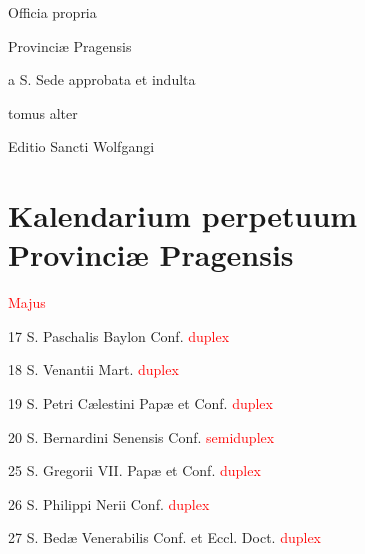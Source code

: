 \documentclass[a4paper, twoside, 10pt]{article}
\newcommand{\rubricatum}[1]{\textcolor{red}{#1}}
\newenvironment{kalendarium}{\setlength{\parindent}{0cm}}{}
\newcommand{\kMensis}[1]{
  \vspace{2mm}
  \hfill {\large\rubricatum{#1}} \hfill
  \vspace{1mm}}
\newcommand{\kDies}[3]{#1 \hspace{2mm} #2 \rubricatum{#3}

}
\begin{document}
\pagestyle{empty}

\begin{center}
{\Huge 
  Officia propria

  Provinciæ Pragensis}

{\Large 
  a S. Sede approbata et indulta}

\vfill

tomus alter

\vfill

Editio Sancti Wolfgangi
\end{center}

\cleardoublepage

\section*{Kalendarium perpetuum\\Provinciæ Pragensis}

\begin{kalendarium}

\kMensis{Majus}

\kDies{17}{S. Paschalis Baylon Conf.}{duplex}
\kDies{18}{S. Venantii Mart.}{duplex}
\kDies{19}{S. Petri Cælestini Papæ et Conf.}{duplex}
\kDies{20}{S. Bernardini Senensis Conf.}{semiduplex}
\kDies{25}{S. Gregorii VII. Papæ et Conf.}{duplex}
\kDies{26}{S. Philippi Nerii Conf.}{duplex}
\kDies{27}{S. Bedæ Venerabilis Conf. et Eccl. Doct.}{duplex}

\end{kalendarium}
\end{document}
